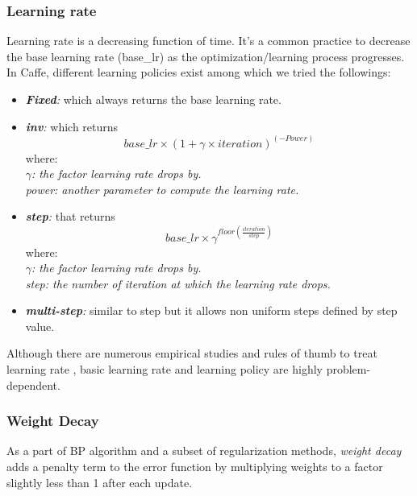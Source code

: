 \subsubsection{Learning rate}
\label{learning rate}
Learning rate is a decreasing function of time. It's a common practice to decrease the base learning rate (base\_lr) as the optimization/learning process progresses. In Caffe, different learning policies exist among which we tried the followings:
\begin{itemize}
\item \textit{\textbf{Fixed}:} which always returns the base learning rate.
\item \textit{\textbf{inv}:} which returns $$base\_lr \times (1 + \gamma \times iteration) ^ {(-Power)}$$ where:\\\textit{ $\gamma$: the factor learning rate drops by.}\\\textit{power: another parameter to compute the learning rate.}

\item \textit{\textbf{step}:} that returns $$base\_lr \times \gamma ^ {floor(\frac{iteration}{step})}$$ where:\\ \textit{$\gamma$: the factor learning rate drops by.}\\\textit{step: the number of iteration at which the learning rate drops.} 
\item \textit{\textbf{multi-step}:} similar to step but it allows non uniform steps defined by step value.
\end{itemize}
Although there are numerous empirical studies and rules of thumb to treat learning rate \cite{senior2013empirical,yu1995dynamic,minai1990acceleration}, basic learning rate and learning policy are highly problem-dependent.  

\subsubsection{Weight Decay}


As a part of BP algorithm and a subset of regularization methods, \textit{weight decay} adds a penalty term to the error function by multiplying weights to a factor slightly less than 1 after each update. 

